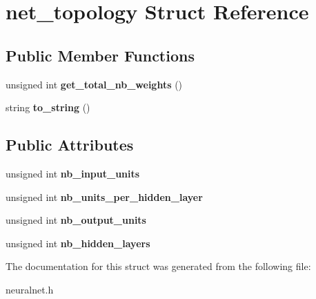 \hypertarget{structnet__topology}{\section{net\-\_\-topology Struct Reference}
\label{structnet__topology}
}
\subsection*{Public Member Functions}
\begin{DoxyCompactItemize}
\item 
\hypertarget{structnet__topology_af25fe4ae6c2f5d74a975c0706d9f8961}{unsigned int {\bfseries get\-\_\-total\-\_\-nb\-\_\-weights} ()}\label{structnet__topology_af25fe4ae6c2f5d74a975c0706d9f8961}

\item 
\hypertarget{structnet__topology_a4160d0c5538ffdd2d3dca43be63f4dd2}{string {\bfseries to\-\_\-string} ()}\label{structnet__topology_a4160d0c5538ffdd2d3dca43be63f4dd2}

\end{DoxyCompactItemize}
\subsection*{Public Attributes}
\begin{DoxyCompactItemize}
\item 
\hypertarget{structnet__topology_a345bfe167c9ad673ce83f524d16e2e60}{unsigned int {\bfseries nb\-\_\-input\-\_\-units}}\label{structnet__topology_a345bfe167c9ad673ce83f524d16e2e60}

\item 
\hypertarget{structnet__topology_a469559ffc92c5db31d01ab57814662a8}{unsigned int {\bfseries nb\-\_\-units\-\_\-per\-\_\-hidden\-\_\-layer}}\label{structnet__topology_a469559ffc92c5db31d01ab57814662a8}

\item 
\hypertarget{structnet__topology_a56a9faef666829e261bb23fc6b0ccc53}{unsigned int {\bfseries nb\-\_\-output\-\_\-units}}\label{structnet__topology_a56a9faef666829e261bb23fc6b0ccc53}

\item 
\hypertarget{structnet__topology_a3efe7d1cda6f053c1377d4c2b403dd2c}{unsigned int {\bfseries nb\-\_\-hidden\-\_\-layers}}\label{structnet__topology_a3efe7d1cda6f053c1377d4c2b403dd2c}

\end{DoxyCompactItemize}


The documentation for this struct was generated from the following file\-:\begin{DoxyCompactItemize}
\item 
neuralnet.\-h\end{DoxyCompactItemize}
